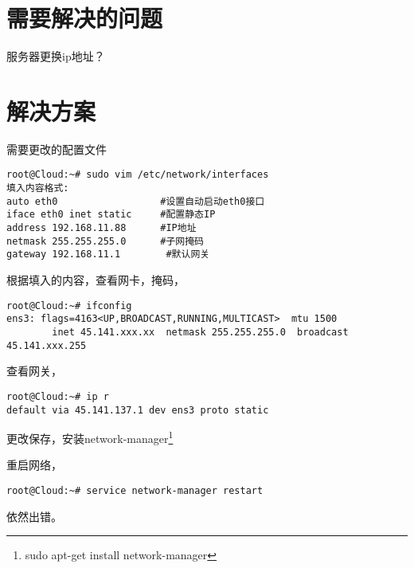 \documentclass{article}
\begin{document}
\section{需要解决的问题}
服务器更换ip地址？
\section{解决方案}
需要更改的配置文件
\begin{lstlisting}
root@Cloud:~# sudo vim /etc/network/interfaces 
填入内容格式:
auto eth0                  #设置自动启动eth0接口
iface eth0 inet static     #配置静态IP
address 192.168.11.88      #IP地址
netmask 255.255.255.0      #子网掩码
gateway 192.168.11.1        #默认网关
\end{lstlisting}

根据填入的内容，查看网卡，掩码，
\begin{lstlisting}
root@Cloud:~# ifconfig
ens3: flags=4163<UP,BROADCAST,RUNNING,MULTICAST>  mtu 1500
        inet 45.141.xxx.xx  netmask 255.255.255.0  broadcast 45.141.xxx.255
\end{lstlisting}

查看网关，
\begin{lstlisting}
root@Cloud:~# ip r 
default via 45.141.137.1 dev ens3 proto static
\end{lstlisting}

更改保存，安装network-manager\footnote{sudo apt-get install network-manager}

重启网络，
\begin{lstlisting}
root@Cloud:~# service network-manager restart
\end{lstlisting}

依然出错。
\end{document}
